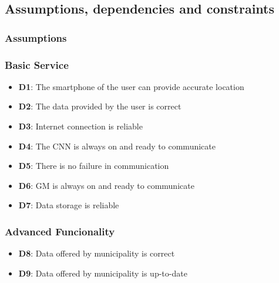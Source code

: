 \subsection{Assumptions, dependencies and constraints}

\subsubsection{Assumptions}

\subsubsection*{Basic Service}

\begin{itemize}


\item \textbf{D1}: The smartphone of the user can provide accurate location

\item \textbf{D2}: The data provided by the user is correct

\item \textbf{D3}: Internet connection is reliable

\item \textbf{D4}: The CNN is always on and ready to communicate

\item \textbf{D5}: There is no failure in communication

\item \textbf{D6}: GM is always on and ready to communicate

\item \textbf{D7}: Data storage is reliable

\end{itemize}

\subsubsection*{Advanced Funcionality}

\begin{itemize}

\item \textbf{D8}: Data offered by municipality is correct

\item \textbf{D9}: Data offered by municipality is up-to-date

\end{itemize}

